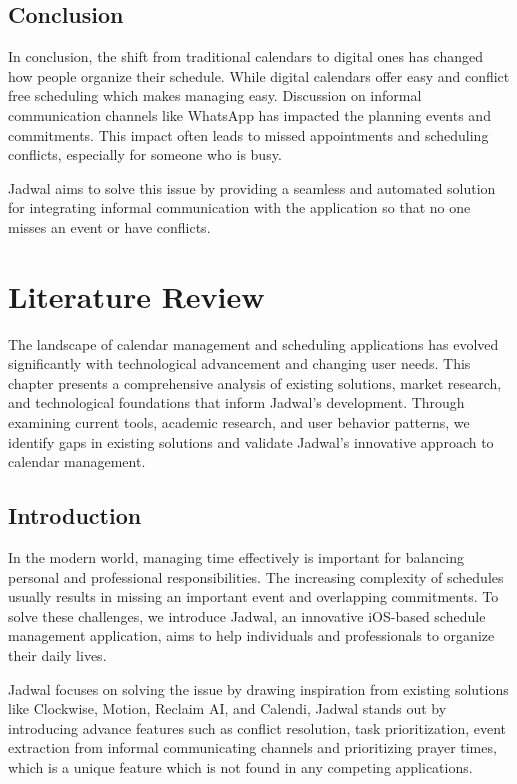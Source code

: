 \documentclass[12pt,a4paper,twoside]{report}
\begin{document}
\section{Conclusion}

In conclusion, the shift from traditional calendars to digital ones has changed how people organize their schedule.
While digital calendars offer easy and conflict free scheduling which makes managing easy.
Discussion on informal communication channels like WhatsApp has impacted the planning events and commitments.
This impact often leads to missed appointments and scheduling conflicts, especially for someone who is busy.

Jadwal aims to solve this issue by providing a seamless and automated solution for integrating informal communication with the application so that no one misses an event or have conflicts.

\chapter{Literature Review}

The landscape of calendar management and scheduling applications has evolved significantly with technological advancement and changing user needs. This chapter presents a comprehensive analysis of existing solutions, market research, and technological foundations that inform Jadwal's development. Through examining current tools, academic research, and user behavior patterns, we identify gaps in existing solutions and validate Jadwal's innovative approach to calendar management.

\section{Introduction}

In the modern world, managing time effectively is important for balancing personal and professional responsibilities.
The increasing complexity of schedules usually results in missing an important event and overlapping commitments.
To solve these challenges, we introduce Jadwal, an innovative iOS-based schedule management application, aims to help individuals and professionals to organize their daily lives.

Jadwal focuses on solving the issue by drawing inspiration from existing solutions like Clockwise, Motion, Reclaim AI, and Calendi, Jadwal stands out by introducing advance features such as conflict resolution, task prioritization, event extraction from informal communicating channels and prioritizing prayer times, which is a unique feature which is not found in any competing applications.
\end{document}
